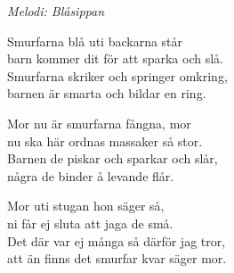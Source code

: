 {\footnotesize\textit{Melodi: Blåsippan}}\par
\vspace{10pt}
Smurfarna blå uti backarna står\\
barn kommer dit för att sparka och slå.\\
Smurfarna skriker och springer omkring,\\
barnen är smarta och bildar en ring.\par
\vspace{10pt}
Mor nu är smurfarna fångna, mor\\
nu ska här ordnas massaker så stor.\\
Barnen de piskar och sparkar och slår,\\
några de binder å levande flår.\par
\vspace{10pt}
Mor uti stugan hon säger så,\\
ni får ej sluta att jaga de små.\\
Det där var ej många så därför jag tror,\\
att än finns det smurfar kvar säger mor.

